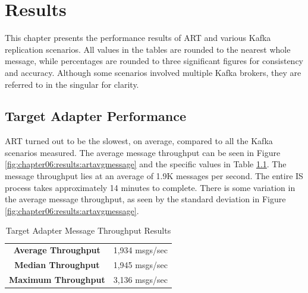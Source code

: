 \chapter{Results}
\label{ch06:results}
This chapter presents the performance results of \ac{ART} and various Kafka replication scenarios. All values in the tables are rounded to the nearest whole message, while percentages are rounded to three significant figures for consistency and accuracy. Although some scenarios involved multiple Kafka brokers, they are referred to in the singular for clarity.

\section{Target Adapter Performance}
\label{ch06:results:artperformance}
\ac{ART} turned out to be the slowest, on average, compared to all the Kafka scenarios measured. The average message throughput can be seen in Figure \ref{fig:chapter06:results:artavgmessage} and the specific values in Table \ref{tab:art:messagethroughput}. The message throughput lies at an average of 1.9K messages per second. The entire \ac{IS} process takes approximately 14 minutes to complete. There is some variation in the average message throughput, as seen by the standard deviation in Figure \ref{fig:chapter06:results:artavgmessage}.

\begin{table}
    \centering
    \begin{tabular}{|cc|}
        \hline
         \textbf{Average Throughput} & 1,934 msgs/sec \\
         \textbf{Median Throughput} & 1,945 msgs/sec \\
         \textbf{Maximum Throughput} & 3,136 msgs/sec \\
        \hline
    \end{tabular}
    \caption{Target Adapter Message Throughput Results}
    \label{tab:art:messagethroughput}
\end{table}

